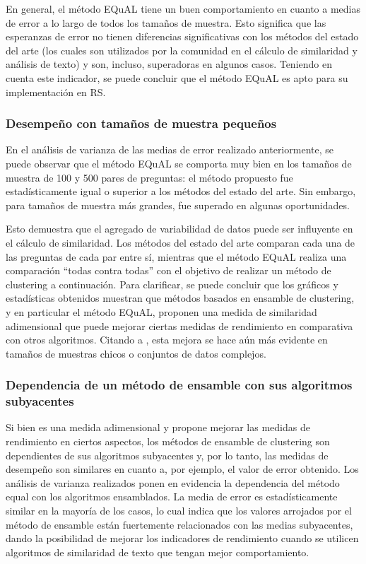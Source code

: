 \bigskip En general, el método EQuAL tiene un buen comportamiento en cuanto a medias de error a lo largo de todos los tamaños de muestra. Esto significa que las esperanzas de error no tienen diferencias significativas con los métodos del estado del arte (los cuales son utilizados por la comunidad en el cálculo de similaridad y análisis de texto) y son, incluso, superadoras en algunos casos. Teniendo en cuenta este indicador, se puede concluir que el método EQuAL es apto para su implementación en RS.

\subsubsection{Desempeño con tamaños de muestra pequeños}
En el análisis de varianza de las medias de error realizado anteriormente, se puede observar que el método EQuAL se comporta muy bien en los tamaños de muestra de 100 y 500 pares de preguntas: el método propuesto fue estadísticamente igual o superior a los métodos del estado del arte. Sin embargo, para tamaños de muestra más grandes, fue superado en algunas oportunidades.

\bigskip Esto demuestra que el agregado de variabilidad de datos puede ser influyente en el cálculo de similaridad. Los métodos del estado del arte comparan cada una de las preguntas de cada par entre sí, mientras que el método EQuAL realiza una comparación “todas contra todas” con el objetivo de realizar un método de clustering a continuación. Para clarificar, se puede concluir que los gráficos y estadísticas obtenidos muestran que métodos basados en ensamble de clustering, y en particular el método EQuAL, proponen una medida de similaridad adimensional que puede mejorar ciertas medidas de rendimiento en comparativa con otros algoritmos. Citando a \cite{fred2005combining}, esta mejora se hace aún más evidente en tamaños de muestras chicos o conjuntos de datos complejos.

\subsubsection{Dependencia de un método de ensamble con sus algoritmos subyacentes}
Si bien es una medida adimensional y propone mejorar las medidas de rendimiento en ciertos aspectos, los métodos de ensamble de clustering son dependientes de sus algoritmos subyacentes y, por lo tanto, las medidas de desempeño son similares en cuanto a, por ejemplo, el valor de error obtenido. Los análisis de varianza realizados ponen en evidencia la dependencia del método equal con los algoritmos ensamblados. La media de error es estadísticamente similar en la mayoría de los casos, lo cual indica que los valores arrojados por el método de ensamble están fuertemente relacionados con las medias subyacentes, dando la posibilidad de mejorar los indicadores de rendimiento cuando se utilicen algoritmos de similaridad de texto que tengan mejor comportamiento.

